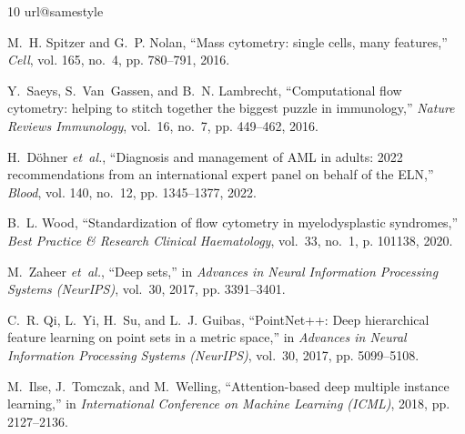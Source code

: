 \documentclass[10pt,journal,compsoc]{IEEEtran}
\begin{document}

\begin{thebibliography}{10}
\providecommand{\url}[1]{#1}
\csname url@samestyle\endcsname
\providecommand{\newblock}{\relax}
\providecommand{\bibinfo}[2]{#2}
\providecommand{\BIBentrySTDinterwordspacing}{\spaceskip=0pt\relax}
\providecommand{\BIBentryALTinterwordstretchfactor}{4}
\providecommand{\BIBentryALTinterwordspacing}{\spaceskip=\fontdimen2\font plus
\BIBentryALTinterwordstretchfactor\fontdimen3\font minus
  \fontdimen4\font\relax}
\providecommand{\BIBforeignlanguage}[2]{{%
\expandafter\ifx\csname l@#1\endcsname\relax
\typeout{** WARNING: IEEEtran.bst: No hyphenation pattern has been}%
\typeout{** loaded for the language `#1'. Using the pattern for}%
\typeout{** the default language instead.}%
\else
\language=\csname l@#1\endcsname
\fi
#2}}
\providecommand{\BIBdecl}{\relax}
\BIBdecl

M.~H. Spitzer and G.~P. Nolan, ``Mass cytometry: single cells, many features,'' \emph{Cell}, vol. 165, no.~4, pp. 780--791, 2016.

Y.~Saeys, S.~Van~Gassen, and B.~N. Lambrecht, ``Computational flow cytometry: helping to stitch together the biggest puzzle in immunology,'' \emph{Nature Reviews Immunology}, vol.~16, no.~7, pp. 449--462, 2016.

H.~D{\"o}hner \emph{et~al.}, ``Diagnosis and management of AML in adults: 2022 recommendations from an international expert panel on behalf of the ELN,'' \emph{Blood}, vol. 140, no.~12, pp. 1345--1377, 2022.

B.~L. Wood, ``Standardization of flow cytometry in myelodysplastic syndromes,'' \emph{Best Practice \& Research Clinical Haematology}, vol.~33, no.~1, p. 101138, 2020.

M.~Zaheer \emph{et~al.}, ``Deep sets,'' in \emph{Advances in Neural Information Processing Systems (NeurIPS)}, vol.~30, 2017, pp. 3391--3401.

C.~R. Qi, L.~Yi, H.~Su, and L.~J. Guibas, ``PointNet++: Deep hierarchical feature learning on point sets in a metric space,'' in \emph{Advances in Neural Information Processing Systems (NeurIPS)}, vol.~30, 2017, pp. 5099--5108.

M.~Ilse, J.~Tomczak, and M.~Welling, ``Attention-based deep multiple instance learning,'' in \emph{International Conference on Machine Learning (ICML)}, 2018, pp. 2127--2136.


\end{thebibliography}
\end{document}
